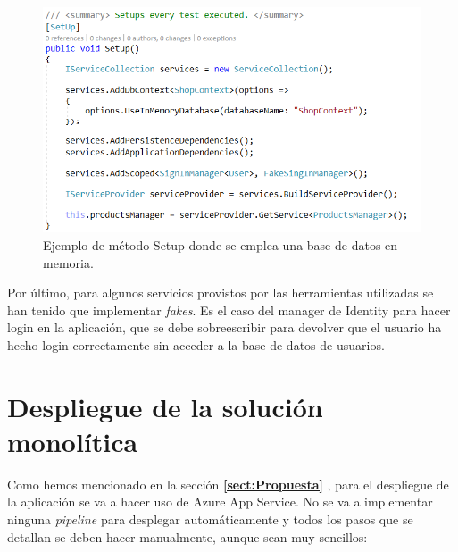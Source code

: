 \documentclass[11pt,spanish,listoffigures]{tfgetsinf}
\begin{document}
\begin{figure}[h]
\centering
\includegraphics[scale=0.8]{SetupTest}
\caption{Ejemplo de método Setup donde se emplea una base de datos en memoria.}
\label{fig:SetupTest}
\end{figure}

Por último, para algunos servicios provistos por las herramientas utilizadas se han tenido que implementar \textit{fakes}. Es el caso del manager de Identity para hacer login en la aplicación, que se debe sobreescribir para devolver que el usuario ha hecho login correctamente sin acceder a la base de datos de usuarios.

\newpage

\section{Despliegue de la solución monolítica}

Como hemos mencionado en la sección \textbf{\ref{sect:Propuesta} }, para el despliegue de la aplicación se va a hacer uso de Azure App Service. No se va a implementar ninguna \textit{pipeline} para desplegar automáticamente y todos los pasos que se detallan se deben hacer manualmente, aunque sean muy sencillos:
\end{document}
